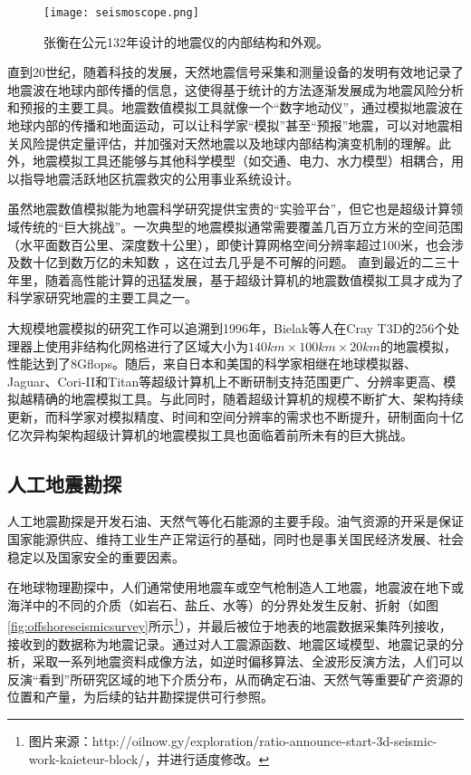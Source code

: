 \begin{figure}[ht]
\centering
\texttt{[image: seismoscope.png]}
\caption{张衡在公元132年设计的地震仪的内部结构和外观\citep{hsiao2009review}。}
\label{fig:heng-scope}
\end{figure}

直到20世纪，随着科技的发展，天然地震信号采集和测量设备的发明有效地记录了地震波在地球内部传播的信息，这使得基于统计的方法逐渐发展成为地震风险分析和预报的主要工具。地震数值模拟工具就像一个“数字地动仪”，通过模拟地震波在地球内部的传播和地面运动，可以让科学家“模拟”甚至“预报”地震，可以对地震相关风险提供定量评估，并加强对天然地震以及地球内部结构演变机制的理解。此外，地震模拟工具还能够与其他科学模型（如交通、电力、水力模型）相耦合，用以指导地震活跃地区抗震救灾的公用事业系统设计。

虽然地震数值模拟能为地震科学研究提供宝贵的“实验平台”，但它也是超级计算领域传统的“巨大挑战”。一次典型的地震模拟通常需要覆盖几百万立方米的空间范围（水平面数百公里、深度数十公里），即使计算网格空间分辨率超过100米，也会涉及数十亿到数万亿的未知数 \citep{cui2010scalable}，这在过去几乎是不可解的问题。 直到最近的二三十年里，随着高性能计算的迅猛发展，基于超级计算机的地震数值模拟工具才成为了科学家研究地震的主要工具之一。

大规模地震模拟的研究工作可以追溯到1996年，Bielak等人在Cray T3D的256个处理器上使用非结构化网格进行了区域大小为$140km \times 100km \times 20km$的地震模拟\citep{bao1996earthquake}，性能达到了8Gflops。随后，来自日本和美国的科学家相继在地球模拟器\cite{chen2006glueball}、Jaguar\cite{carrington2008high}、Cori-II\citep{breuer2017edge}和Titan\cite{cui2013physics}等超级计算机上不断研制支持范围更广、分辨率更高、模拟越精确的地震模拟工具。与此同时，随着超级计算机的规模不断扩大、架构持续更新，而科学家对模拟精度、时间和空间分辨率的需求也不断提升，研制面向十亿亿次异构架构超级计算机的地震模拟工具也面临着前所未有的巨大挑战。

\subsection{人工地震勘探}

人工地震勘探是开发石油、天然气等化石能源的主要手段。油气资源的开采是保证国家能源供应、维持工业生产正常运行的基础，同时也是事关国民经济发展、社会稳定以及国家安全的重要因素\cite{甘霖2016面向地球科学数值模拟的可重构计算方法研究}。

在地球物理勘探中，人们通常使用地震车或空气枪制造人工地震，地震波在地下或海洋中的不同的介质（如岩石、盐丘、水等）的分界处发生反射、折射（如图\ref{fig:offshoreseismicsurvey}所示\footnote{图片来源：http://oilnow.gy/exploration/ratio-announce-start-3d-seismic-work-kaieteur-block/，并进行适度修改。}），并最后被位于地表的地震数据采集阵列接收，接收到的数据称为地震记录。通过对人工震源函数、地震区域模型、地震记录的分析，采取一系列地震资料成像方法，如逆时偏移算法、全波形反演方法，人们可以反演“看到”所研究区域的地下介质分布，从而确定石油、天然气等重要矿产资源的位置和产量，为后续的钻井勘探提供可行参照。

